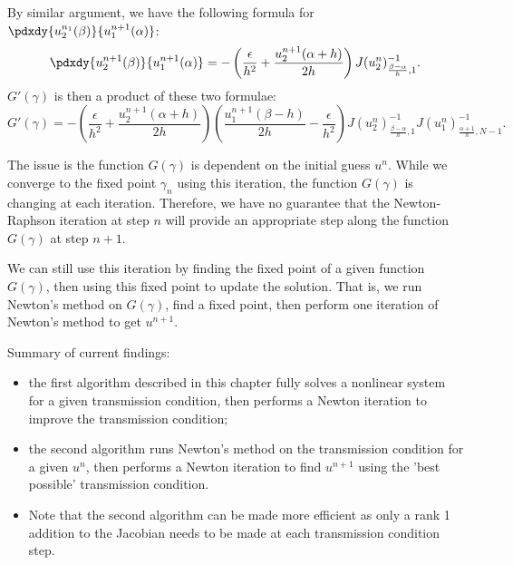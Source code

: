 \documentclass{book}
\begin{document}
By similar argument, we have the following formula for $\pdxdy{u^{n_1}_2(\beta)}{u^{n+1}_1(\alpha)}$:
\begin{equation*}
\pdxdy{u^{n+1}_2(\beta)}{u^{n+1}_1(\alpha)} = -\left(\frac{\epsilon}{h^2} + \frac{u^{n+1}_2(\alpha+h)}{2h} \right) J(u^n_2)^{-1}_{\frac{\beta-\alpha}{h}, 1} .
\end{equation*}
$G'(\gamma)$ is then a product of these two formulae:
\begin{equation*}
G'(\gamma) = -\left(\frac{\epsilon}{h^2} + \frac{u^{n+1}_2(\alpha+h)}{2h} \right) \left ( \frac{u^{n+1}_1(\beta-h)}{2h} - \frac{\epsilon}{h^2} \right ) J(u^n_2)^{-1}_{\frac{\beta-\alpha}{h}, 1} J(u^n_1)^{-1}_{\frac{\alpha+1}{h},N-1} .
\end{equation*}

The issue is the function $G(\gamma)$ is dependent on the initial guess $u^n$.
While we converge to the fixed point $\gamma_n$ using this iteration, the function $G(\gamma)$ is changing at each iteration.
Therefore, we have no guarantee that the Newton-Raphson iteration at step $n$ will provide an appropriate step along the function $G(\gamma)$ at step $n+1$.

We can still use this iteration by finding the fixed point of a given function $G(\gamma)$, then using this fixed point to update the solution.
That is, we run Newton's method on $G(\gamma)$, find a fixed point, then perform one iteration of Newton's method to get $u^{n+1}$.

Summary of current findings:
\begin{itemize}
\item the first algorithm described in this chapter fully solves a nonlinear system for a given transmission condition, then performs a Newton iteration to improve the transmission condition;
\item the second algorithm runs Newton's method on the transmission condition for a given $u^n$, then performs a Newton iteration to find $u^{n+1}$ using the 'best possible' transmission condition.
\item Note that the second algorithm can be made more efficient as only a rank 1 addition to the Jacobian needs to be made at each transmission condition step.
\end{itemize}
\end{document}
